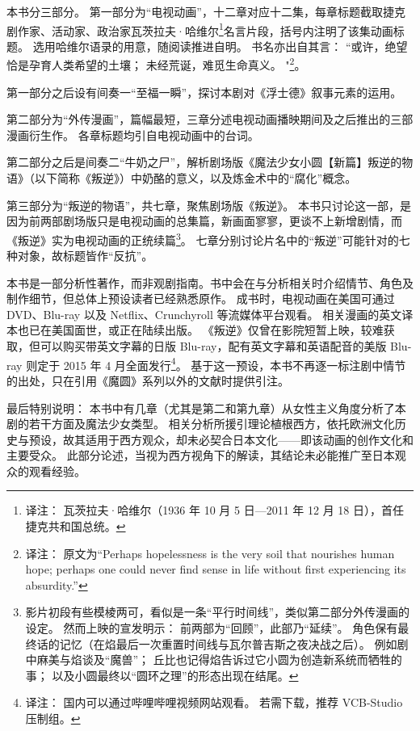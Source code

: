 本书分三部分。
第一部分为“电视动画”，十二章对应十二集，每章标题截取捷克剧作家、活动家、政治家瓦茨拉夫·哈维尔\footnote{%
    译注：
    瓦茨拉夫·哈维尔（1936 年 10 月 5 日—2011 年 12 月 18 日），首任捷克共和国总统。
}名言片段，括号内注明了该集动画标题。
选用哈维尔语录的用意，随阅读推进自明。
书名亦出自其言：
``或许，绝望恰是孕育人类希望的土壤；
未经荒诞，难觅生命真义。 %
"\footnote{%
    译注：
    原文为``Perhaps hopelessness is the very soil that nourishes human hope;
    perhaps one could never find sense in life without first experiencing its absurdity.''
}\cite{shipley2003havel}。

第一部分之后设有间奏一“至福一瞬”，探讨本剧对《浮士德》叙事元素的运用。

第二部分为“外传漫画”，篇幅最短，三章分述电视动画播映期间及之后推出的三部漫画衍生作。
各章标题均引自电视动画中的台词。

第二部分之后是间奏二“牛奶之尸”，解析剧场版《魔法少女小圆【新篇】叛逆的物语》（以下简称《叛逆》）中奶酪的意义，以及炼金术中的“腐化”概念。

第三部分为“叛逆的物语”，共七章，聚焦剧场版《叛逆》。
本书只讨论这一部，是因为前两部剧场版只是电视动画的总集篇，新画面寥寥，更谈不上新增剧情，而《叛逆》实为电视动画的正统续篇\footnote{%
    影片初段有些模棱两可，看似是一条“平行时间线”，类似第二部分外传漫画的设定。
    然而上映的宣发明示：
    前两部为“回顾”，此部乃“延续”。
    角色保有最终话的记忆（在焰最后一次重置时间线与瓦尔普吉斯之夜决战之后）。
    例如剧中麻美与焰谈及“魔兽”；
    丘比也记得焰告诉过它小圆为创造新系统而牺牲的事；
    以及小圆最终以“圆环之理”的形态出现在结尾。
}。
七章分别讨论片名中的“叛逆”可能针对的七种对象，故标题皆作“反抗\underline{\makebox[1cm]{}}”。

本书是一部分析性著作，而非观剧指南。书中会在与分析相关时介绍情节、角色及制作细节，但总体上预设读者已经熟悉原作。
成书时，电视动画在美国可通过 DVD、Blu-ray 以及 Netflix、Crunchyroll 等流媒体平台观看。
相关漫画的英文译本也已在美国面世，或正在陆续出版。
《叛逆》仅曾在影院短暂上映，较难获取，但可以购买带英文字幕的日版 Blu-ray，配有英文字幕和英语配音的美版 Blu-ray 则定于 2015 年 4 月全面发行\footnote{%
    译注：
    国内可以通过哔哩哔哩视频网站观看。
    若需下载，推荐 VCB-Studio 压制组。
}。
基于这一预设，本书不再逐一标注剧中情节的出处，只在引用《魔圆》系列以外的文献时提供引注。

最后特别说明：
本书中有几章（尤其是第二和第九章）从女性主义角度分析了本剧的若干方面及魔法少女类型。
相关分析所援引理论植根西方，依托欧洲文化历史与预设，故其适用于西方观众，却未必契合日本文化——即该动画的创作文化和主要受众。
此部分论述，当视为西方视角下的解读，其结论未必能推广至日本观众的观看经验。

